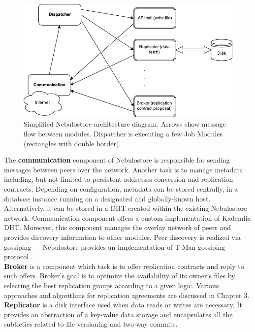 \documentclass{pracamgren}
\begin{document}
\begin{figure}[h]
\centering
\includegraphics[scale=1.25]{arch.pdf}
\caption{Simplified Nebulostore architecture diagram. Arrows show message flow between modules. Dispatcher is executing a few Job Modules (rectangles with double border).}
\end{figure}

The {\bf communication} component of Nebulostore is responsible for sending messages between peers over the network. Another task is to manage metadata including, but not limited to persistent addresses conversion and replication contracts. Depending on configuration, metadata can be stored centrally, in a database instance running on a designated and globally-known host. Alternatively, it can be stored in a DHT created within the existing Nebulostore network. Communication component offers a custom implementation of Kademlia \cite{kademlia} DHT. Moreover, this component manages the overlay network of peers and provides discovery information to other modules. Peer discovery is realized via gossiping \cite{gossiping} --- Nebulostore provides an implementation of T-Man gossiping protocol \cite{tman}.\\

{\bf Broker} is a component which task is to offer replication contracts and reply to such offers. Broker's goal is to optimize the availability of its owner's files by selecting the best replication groups according to a given logic. Various approaches and algorithms for replication agreements are discussed in Chapter 3.\\

{\bf Replicator} is a disk interface used when data reads or writes are necessary. It provides an abstraction of a key-value data storage and encapsulates all the subtleties related to file versioning and two-way commits.\\
\end{document}
